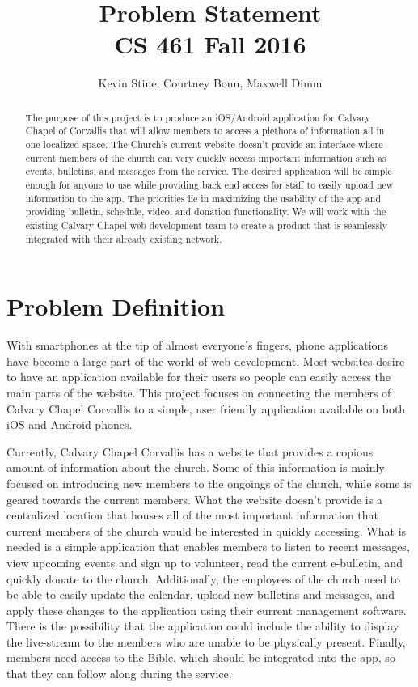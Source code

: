 \documentclass[letterpaper,10pt,draftclsnofoot,onecolumn,titlepage]{IEEEtran}
\def\name{Kevin Stine, Courtney Bonn, Maxwell Dimm}
\begin{document}
	\title{\huge Problem Statement \\ CS 461 Fall 2016}
	\author{\large \name}
	
	\maketitle
		\begin{abstract}The purpose of this project is to produce an iOS/Android application for Calvary Chapel of Corvallis that will allow members to access a plethora of information all in one localized space. 
		The Church's current website doesn't provide an interface where current members of the church can very quickly access important information such as events, bulletins, and messages from the service. 
		The desired application will be simple enough for anyone to use while providing back end access for staff to easily upload new information to the app. 
		The priorities lie in maximizing the usability of the app and providing bulletin, schedule, video, and donation functionality. 
		We will work with the existing Calvary Chapel web development team to create a product that is seamlessly integrated with their already existing network. 
		\end{abstract}
	
	\clearpage	
		
	\section*{Problem Definition}
	With smartphones at the tip of almost everyone's fingers, phone applications have become a large part of the world of web development. 
	Most websites desire to have an application available for their users so people can easily access the main parts of the website. 
	This project focuses on connecting the members of Calvary Chapel Corvallis to a simple, user friendly application available on both iOS and Android phones. 

	Currently, Calvary Chapel Corvallis has a website that provides a copious amount of information about the church. 
	Some of this information is mainly focused on introducing new members to the ongoings of the church, while some is geared towards the current members.
	What the website doesn't provide is a centralized location that houses all of the most important information that current members of the church would be interested in quickly accessing.
	What is needed is a simple application that enables members to listen to recent messages, view upcoming events and sign up to volunteer, read the current e-bulletin, and quickly donate to the church. 
	Additionally, the employees of the church need to be able to easily update the calendar, upload new bulletins and messages, and apply these changes to the application using their current management software. 
	There is the possibility that the application could include the ability to display the live-stream to the members who are unable to be physically present. 
	Finally, members need access to the Bible, which should be integrated into the app, so that they can follow along during the service. 	
	
\end{document}
